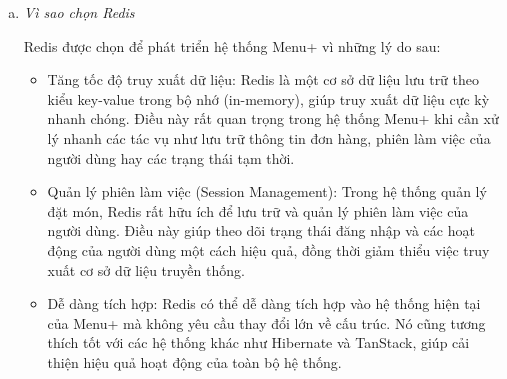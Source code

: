 \begin{enumerate}[(a)]
	\item \textit{Vì sao chọn Redis}

	      Redis được chọn để phát triển hệ thống Menu+ vì những lý do sau:

	      \begin{itemize}
		      \item Tăng tốc độ truy xuất dữ liệu: Redis là một cơ sở dữ liệu lưu trữ theo kiểu key-value trong bộ nhớ (in-memory), giúp truy xuất dữ liệu cực kỳ nhanh chóng. Điều này rất quan trọng trong hệ thống Menu+ khi cần xử lý nhanh các tác vụ như lưu trữ thông tin đơn hàng, phiên làm việc của người dùng hay các trạng thái tạm thời.
		      \item Quản lý phiên làm việc (Session Management): Trong hệ thống quản lý đặt món, Redis rất hữu ích để lưu trữ và quản lý phiên làm việc của người dùng. Điều này giúp theo dõi trạng thái đăng nhập và các hoạt động của người dùng một cách hiệu quả, đồng thời giảm thiểu việc truy xuất cơ sở dữ liệu truyền thống.
		      \item Dễ dàng tích hợp: Redis có thể dễ dàng tích hợp vào hệ thống hiện tại của Menu+ mà không yêu cầu thay đổi lớn về cấu trúc. Nó cũng tương thích tốt với các hệ thống khác như Hibernate và TanStack, giúp cải thiện hiệu quả hoạt động của toàn bộ hệ thống.
	      \end{itemize}


\end{enumerate}


